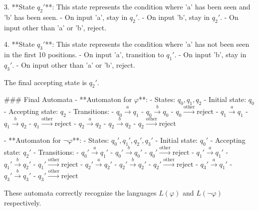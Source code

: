 3. **State \(q_2'\)**: This state represents the condition where 'a' has been seen and 'b' has been seen.
   - On input 'a', stay in \(q_2'\).
   - On input 'b', stay in \(q_2'\).
   - On input other than 'a' or 'b', reject.

4. **State \(q_3'\)**: This state represents the condition where 'a' has not been seen in the first 10 positions.
   - On input 'a', transition to \(q_1'\).
   - On input 'b', stay in \(q_3'\).
   - On input other than 'a' or 'b', reject.

The final accepting state is \(q_2'\).

### Final Automata
- **Automaton for \(\varphi\)**:
  - States: \(q_0, q_1, q_2\)
  - Initial state: \(q_0\)
  - Accepting state: \(q_2\)
  - Transitions:
    - \(q_0 \xrightarrow{a} q_1\)
    - \(q_0 \xrightarrow{b} q_0\)
    - \(q_0 \xrightarrow{\text{other}} \text{reject}\)
    - \(q_1 \xrightarrow{a} q_1\)
    - \(q_1 \xrightarrow{b} q_2\)
    - \(q_1 \xrightarrow{\text{other}} \text{reject}\)
    - \(q_2 \xrightarrow{a} q_2\)
    - \(q_2 \xrightarrow{b} q_2\)
    - \(q_2 \xrightarrow{\text{other}} \text{reject}\)

- **Automaton for \(\neg\varphi\)**:
  - States: \(q_0', q_1', q_2', q_3'\)
  - Initial state: \(q_0'\)
  - Accepting state: \(q_2'\)
  - Transitions:
    - \(q_0' \xrightarrow{a} q_1'\)
    - \(q_0' \xrightarrow{b} q_0'\)
    - \(q_0' \xrightarrow{\text{other}} \text{reject}\)
    - \(q_1' \xrightarrow{a} q_1'\)
    - \(q_1' \xrightarrow{b} q_2'\)
    - \(q_1' \xrightarrow{\text{other}} \text{reject}\)
    - \(q_2' \xrightarrow{a} q_2'\)
    - \(q_2' \xrightarrow{b} q_2'\)
    - \(q_2' \xrightarrow{\text{other}} \text{reject}\)
    - \(q_3' \xrightarrow{a} q_1'\)
    - \(q_3' \xrightarrow{b} q_3'\)
    - \(q_3' \xrightarrow{\text{other}} \text{reject}\)

These automata correctly recognize the languages \(L(\varphi)\) and \(L(\neg\varphi)\) respectively.